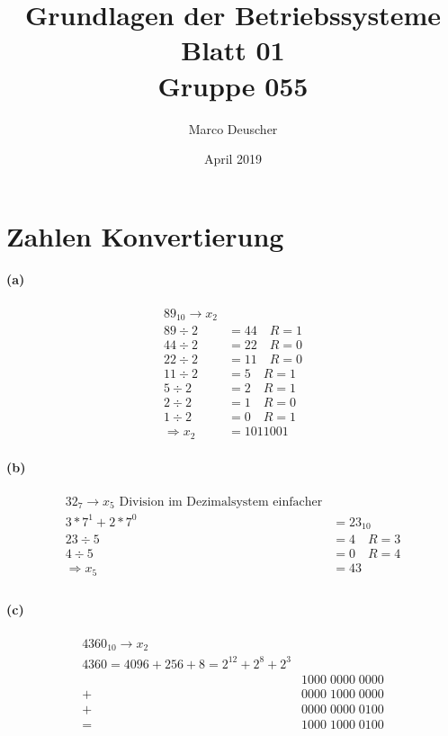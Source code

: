 \documentclass[a4paper]{article}
\title{Grundlagen der Betriebssysteme\\ Blatt 01 \\ Gruppe 055}
\author{Marco Deuscher}
\date{April 2019}
\begin{document}
\maketitle

\section{Zahlen Konvertierung}
\paragraph{(a)}
\begin{align*}
    89_{10} \rightarrow x_2\\
    89\div2 &= 44 \quad R=1\\
    44\div2&=22 \quad R=0\\
    22\div2&=11 \quad R=0\\
    11\div2&=5 \quad R=1\\
    5\div2&=2 \quad R=1\\
    2\div2&=1 \quad R=0\\
    1\div2&=0 \quad R=1\\
    \Rightarrow x_2&=1011001
\end{align*}

\paragraph{(b)}
\begin{align*}
    32_7 \rightarrow x_5\text{ Division im Dezimalsystem einfacher}\\
    3*7^1+2*7^0&=23_{10}\\
    23\div5&=4\quad R=3\\
    4\div5&=0\quad R=4\\
    \Rightarrow x_5&=43\\
\end{align*}

\paragraph{(c)}
\begin{align*}
    4360_{10}\rightarrow x_2\\
    4360=4096+256+8=2^{12}+2^8+2^3\\
    &1000\;0000\;0000\\
    +&0000\;1000\;0000\\
    +&0000\;0000\;0100\\
    =&1000\;1000\;0100\\
\end{align*}
\end{document}
